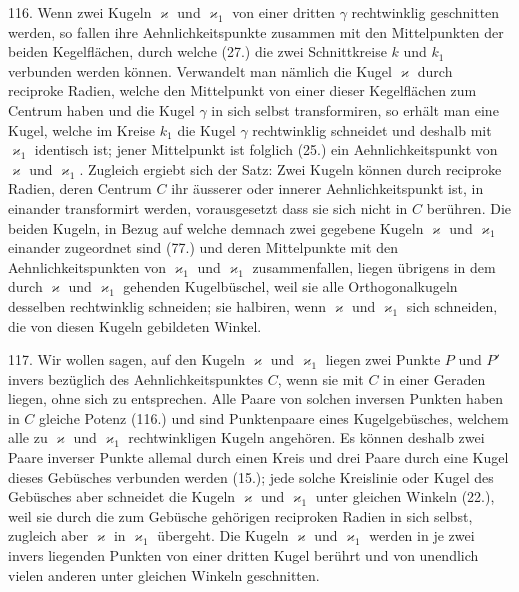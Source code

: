 116. Wenn zwei Kugeln $\varkappa$ und $\varkappa_1$ von einer dritten $\gamma$
rechtwinklig geschnitten werden, so fallen ihre Aehnlichkeitspunkte
zusammen mit den Mittelpunkten der beiden Kegelfl\"achen,
durch welche (27.) die zwei Schnittkreise $k$ und $k_1$
verbunden werden k\"onnen. Verwandelt man n\"amlich die
Kugel $\varkappa$ durch reciproke Radien, welche den Mittelpunkt
von einer dieser Kegelfl\"achen zum Centrum haben und die
Kugel $\gamma$ in sich selbst transformiren, so erh\"alt man eine
Kugel, welche im Kreise $k_1$ die Kugel $\gamma$ rechtwinklig schneidet
und deshalb mit $\varkappa_1$ identisch ist; jener Mittelpunkt ist
folglich (25.) ein Aehnlichkeitspunkt von $\varkappa$ und $\varkappa_1$.
Zugleich ergiebt sich der Satz: Zwei Kugeln k\"onnen durch reciproke
Radien, deren Centrum $C$ ihr \"ausserer oder innerer
Aehnlichkeitspunkt ist, in einander transformirt werden, vorausgesetzt
dass sie sich nicht in $C$ ber\"uhren. Die beiden Kugeln,
in Bezug auf welche demnach zwei gegebene Kugeln $\varkappa$ und
$\varkappa_1$ einander zugeordnet sind (77.) und deren Mittelpunkte
mit den Aehnlichkeitspunkten von $\varkappa_1$ und $\varkappa_1$ zusammenfallen,
liegen \"ubrigens in dem durch $\varkappa$ und $\varkappa_1$ gehenden Kugelb\"uschel,
weil sie alle Orthogonalkugeln desselben rechtwinklig schneiden;
sie halbiren, wenn $\varkappa$ und $\varkappa_1$ sich schneiden, die von
diesen Kugeln gebildeten Winkel.

117. Wir wollen sagen, auf den Kugeln $\varkappa$ und $\varkappa_1$ liegen
zwei Punkte $P$ und $P'$ {\glqq}invers bez\"uglich des Aehnlichkeitspunktes
$C${\grqq}, wenn sie mit $C$ in einer Geraden liegen, ohne
sich zu entsprechen. Alle Paare von solchen inversen Punkten
haben in $C$ gleiche Potenz (116.) und sind Punktenpaare
eines Kugelgeb\"usches, welchem alle zu $\varkappa$ und $\varkappa_1$ rechtwinkligen
Kugeln angeh\"oren. Es k\"onnen deshalb zwei Paare
inverser Punkte allemal durch einen Kreis und drei Paare
durch eine Kugel dieses Geb\"usches verbunden werden (15.);
jede solche Kreislinie oder Kugel des Geb\"usches aber schneidet
die Kugeln $\varkappa$ und $\varkappa_1$ unter gleichen Winkeln (22.), weil sie
durch die zum Geb\"usche geh\"origen reciproken Radien in sich
selbst, zugleich aber $\varkappa$ in $\varkappa_1$ \"ubergeht. Die Kugeln $\varkappa$ und $\varkappa_1$
werden in je zwei invers liegenden Punkten von einer dritten
Kugel ber\"uhrt und von unendlich vielen anderen unter gleichen
Winkeln geschnitten.

